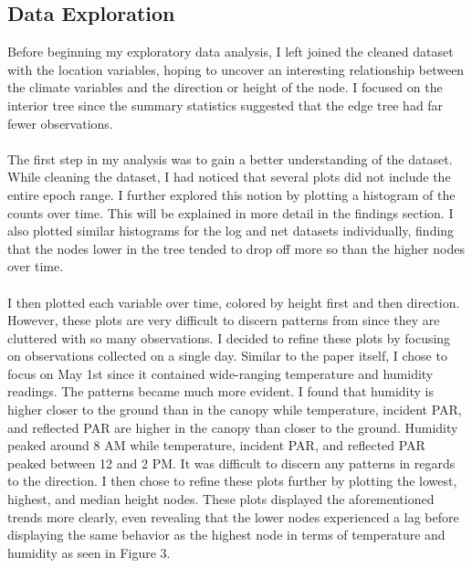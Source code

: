\documentclass[11pt]{article}
\begin{document}
\subsection{Data Exploration}
Before beginning my exploratory data analysis, I left joined the cleaned dataset with the location variables, hoping to uncover an interesting relationship between the climate variables and the direction or height of the node. I focused on the interior tree since the summary statistics suggested that the edge tree had far fewer observations.\\
\\
The first step in my analysis was to gain a better understanding of the dataset. While cleaning the dataset, I had noticed that several plots did not include the entire epoch range. I further explored this notion by plotting a histogram of the counts over time. This will be explained in more detail in the findings section. I also plotted similar histograms for the log and net datasets individually, finding that the nodes lower in the tree tended to drop off more so than the higher nodes over time.\\
\\ 
I then plotted each variable over time, colored by height first and then direction. However, these plots are very difficult to discern patterns from since they are cluttered with so many observations. I decided to refine these plots by focusing on observations collected on a single day. Similar to the paper itself, I chose to focus on May 1st since it contained wide-ranging temperature and humidity readings. The patterns became much more evident. I found that humidity is higher closer to the ground than in the canopy while temperature, incident PAR, and reflected PAR are higher in the canopy than closer to the ground. Humidity peaked around 8 AM while temperature, incident PAR, and reflected PAR peaked between 12 and 2 PM. It was difficult to discern any patterns in regards to the direction. I then chose to refine these plots further by plotting the lowest, highest, and median height nodes. These plots displayed the aforementioned trends more clearly, even revealing that the lower nodes experienced a lag before displaying the same behavior as the highest node in terms of temperature and humidity as seen in Figure 3.\\
\end{document}
